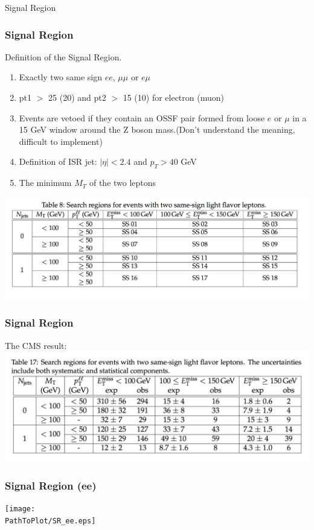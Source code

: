 \documentclass[mathserif,serif]{beamer}
\begin{document}
\def \PathToPlot {../plot}


\begin{frame}
\begin{center}
\huge
Signal Region
\end{center}
\end{frame}

\begin{frame}
\frametitle{Signal Region}
Definition of the Signal Region.
\begin{enumerate}
\item Exactly two same sign $ee$, $\mu\mu$ or $e\mu$
\item pt1 $>$ 25 (20) and pt2 $>$ 15 (10) for electron (muon)
\item Events are vetoed if they contain an OSSF pair formed from loose $e$ or $\mu$ in a 15 GeV window around the Z boson mass.(Don't understand the meaning, difficult to implement)
\item Definition of ISR jet: $|\eta| < 2.4$ and $p_T > 40$ GeV
\item The minimum $M_T$ of the two leptons
\end{enumerate}
\includegraphics[width=1\textwidth]{data/SR.png}
\end{frame}

\begin{frame}
\frametitle{Signal Region}
The CMS result:
\includegraphics[width=1\textwidth]{data/result.png}
\end{frame}

\def \PathToPlot {../plot}
\begin{frame}
\frametitle{Signal Region (ee)}
\texttt{[image: \\PathToPlot/SR\_ee.eps]}
\end{frame}
\end{document}
